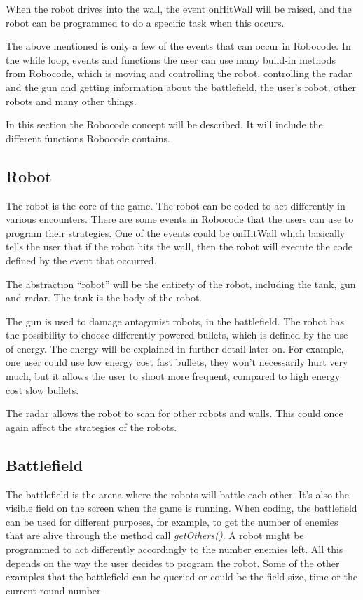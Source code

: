When the robot drives into the wall, the event onHitWall will be raised, and the robot can be programmed to do a specific task when this occurs. 

The above mentioned is only a few of the events that can occur in Robocode. In the while loop, events and functions the user can use many build-in methods from Robocode, which is moving and controlling the robot, controlling the radar and the gun and getting information about the battlefield, the user's robot, other robots and many other things. 


In this section the Robocode concept will be described. It will include the different functions Robocode contains.
  
\subsection{Robot}
The robot is the core of the game. The robot can be coded to act differently in various encounters. There are some events in Robocode that the users can use to program their strategies. One of the events could be onHitWall which basically tells the user that if the robot hits the wall, then the robot will execute the code defined by the event that occurred. 

The abstraction “robot” will be the entirety of the robot, including the tank, gun and radar. The tank is the body of the robot.

The gun is used to damage antagonist robots, in the battlefield. The robot has the possibility to choose differently powered bullets, which is defined by the use of energy. The energy will be explained in further detail later on. For example, one user could use low energy cost fast bullets, they won’t necessarily hurt very much, but it allows the user to shoot more frequent, compared to high energy cost slow bullets. 

The radar allows the robot to scan for other robots and walls. This could once again affect the strategies of the robots.

\subsection{Battlefield}
The battlefield is the arena where the robots will battle each other. It’s also the visible field on the screen when the game is running. When coding, the battlefield can be used for different purposes, for example, to get the number of enemies that are alive through the method call \textit{getOthers()}. A robot might be programmed to act differently accordingly to the number enemies left. All this depends on the way the user decides to program the robot. Some of the other examples that the battlefield can be queried or could be the field size, time or the current round number. 

